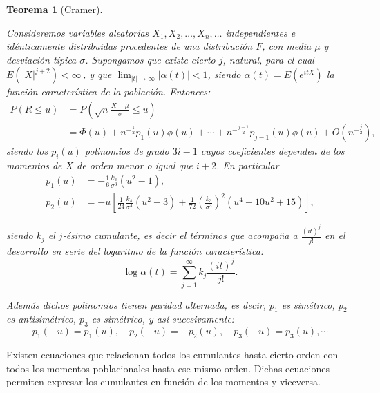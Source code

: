 \documentclass[
]{book}
\theoremstyle{break}
\newtheorem{theorem}{Teorema}[chapter]
\theoremstyle{definition}
\theoremstyle{definition}
\theoremstyle{definition}
\theoremstyle{remark}
\begin{document}
\begin{theorem}[Cramer]
\protect\hypertarget{thm:aprox-cramer}{}{\label{thm:aprox-cramer} \iffalse (Cramer) \fi{} } \vspace{0.5cm}

Consideremos variables aleatorias
\(X_1,X_2,\ldots ,X_n,\ldots\) independientes e idénticamente
distribuidas procedentes de una distribución \(F\), con media \(\mu\) y
desviación típica \(\sigma\). Supongamos que existe cierto \(j\), natural,
para el cual \(E\left( \left\vert X\right\vert^{j+2} \right) <\infty \,\), y que \(\lim_{\left\vert t\right\vert \rightarrow \infty }\left\vert \alpha \left( t \right) \right\vert <1\), siendo \(\alpha \left( t \right) =E\left( e^{itX} \right)\) la función característica de la población.
Entonces:
\[\begin{aligned}
P\left( R\leq u \right) &=P\left( \sqrt{n}\frac{\bar{X}-\mu }{\sigma }
\leq u \right) \\
&= \Phi \left( u \right) +n^{-\frac{1}{2}}p_1\left( u \right) \phi \left(
u \right) +\cdots +n^{-\frac{j-1}{2}}p_{j-1}\left( u \right) \phi \left(
u \right) +O\left( n^{-\frac{j}{2}} \right),
\end{aligned}\]
siendo los \(p_i\left( u \right)\) polinomios de grado \(3i-1\) cuyos coeficientes
dependen de los momentos de \(X\) de orden menor o igual que \(i+2\).
En particular
\[\begin{aligned}
p_1\left( u \right) &= -\frac{1}{6}\frac{k_3}{\sigma^{3}}\left(
u^2-1 \right), \\
p_2\left( u \right) &= -u\left[ \frac{1}{24}\frac{k_4}{\sigma^{4}}\left(
u^2-3 \right) +\frac{1}{72}\left( \frac{k_3}{\sigma^{3}} \right)
^2\left( u^{4}-10u^2+15 \right) \right] ,
\end{aligned}\]

siendo \(k_j\) el \(j\)-ésimo cumulante, es decir el términos que acompaña
a \(\frac{\left( it \right)^{j}}{j!}\) en el desarrollo en serie del
logaritmo de la función característica:
\[\log \alpha \left( t \right) =\sum_{j=1}^{\infty }k_j\frac{\left( it \right)
^{j}}{j!}.\]

Además dichos polinomios tienen paridad alternada, es
decir, \(p_1\) es simétrico, \(p_2\) es antisimétrico, \(p_3\) es
simétrico, y así sucesivamente:
\[p_1\left( -u \right) = p_1\left( u \right),\quad p_2\left( -u \right)
= -p_2\left( u \right),\quad p_3\left( -u \right) = p_3\left( u \right)
,\cdots\]
\end{theorem}

Existen ecuaciones que relacionan todos los cumulantes hasta cierto
orden con todos los momentos poblacionales hasta ese mismo orden. Dichas
ecuaciones permiten expresar los cumulantes en función de los momentos y
viceversa.
\end{document}
